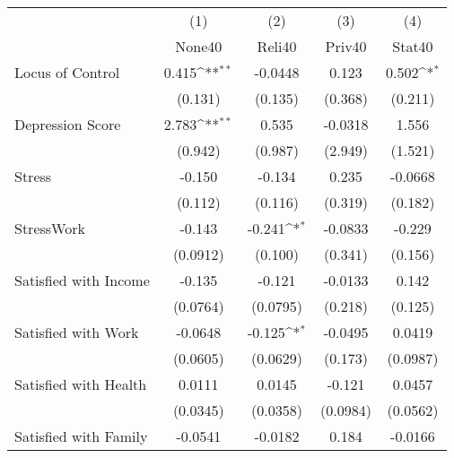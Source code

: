 {
\def\sym#1{\ifmmode^{#1}\else\(^{#1}\)\fi}
\begin{tabular}{l*{4}{c}}
\hline\hline
            &\multicolumn{1}{c}{(1)}&\multicolumn{1}{c}{(2)}&\multicolumn{1}{c}{(3)}&\multicolumn{1}{c}{(4)}\\
            &\multicolumn{1}{c}{None40}&\multicolumn{1}{c}{Reli40}&\multicolumn{1}{c}{Priv40}&\multicolumn{1}{c}{Stat40}\\
\hline
Locus of Control&       0.415\sym{**} &     -0.0448         &       0.123         &       0.502\sym{*}  \\
            &     (0.131)         &     (0.135)         &     (0.368)         &     (0.211)         \\
[1em]
Depression Score&       2.783\sym{**} &       0.535         &     -0.0318         &       1.556         \\
            &     (0.942)         &     (0.987)         &     (2.949)         &     (1.521)         \\
[1em]
Stress      &      -0.150         &      -0.134         &       0.235         &     -0.0668         \\
            &     (0.112)         &     (0.116)         &     (0.319)         &     (0.182)         \\
[1em]
StressWork  &      -0.143         &      -0.241\sym{*}  &     -0.0833         &      -0.229         \\
            &    (0.0912)         &     (0.100)         &     (0.341)         &     (0.156)         \\
[1em]
Satisfied with Income&      -0.135         &      -0.121         &     -0.0133         &       0.142         \\
            &    (0.0764)         &    (0.0795)         &     (0.218)         &     (0.125)         \\
[1em]
Satisfied with Work&     -0.0648         &      -0.125\sym{*}  &     -0.0495         &      0.0419         \\
            &    (0.0605)         &    (0.0629)         &     (0.173)         &    (0.0987)         \\
[1em]
Satisfied with Health&      0.0111         &      0.0145         &      -0.121         &      0.0457         \\
            &    (0.0345)         &    (0.0358)         &    (0.0984)         &    (0.0562)         \\
[1em]
Satisfied with Family&     -0.0541         &     -0.0182         &       0.184         &     -0.0166         \\

\end{tabular}}
